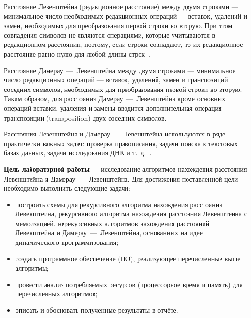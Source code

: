 
Расстояние Левенштейна (редакционное расстояние) между двумя строками --- минимальное число необходимых редакционных операций --- вставок, удалений и замен, необходимых для преобразования первой строки во вторую. При этом совпадения символов не являются операциями, которые учитываются в
редакционном расстоянии, поэтому, если строки совпадают, то их редакционное
расстояние равно нулю для любой длины строк~\cite{ulianov}. 

Расстояние Дамерау~---~Левенштейна между двумя строками --- минимальное число редакционных операций --- вставок, удалений, замен и транспозиций соседних символов, необходимых для преобразования первой строки во вторую. Таким образом, для расстояния Дамерау~---~Левенштейна кроме основных операций вставки, удаления и замены вводится дополнительная операция транспозиции (transposition) двух соседних символов.

Расстояния Левенштейна и Дамерау~---~Левенштейна используются в ряде практически важных задач: проверка правописания, задачи поиска в текстовых базах данных, задачи исследования ДНК и т.~д.~\cite{ulianov}.

\textbf{Цель лабораторной работы} --- исследование алгоритмов нахождения расстояния Левенштейна и Дамерау~---~Левенштейна. Для достижения поставленной цели необходимо выполнить следующие задачи:

\begin{itemize}
\item построить схемы для рекурсивного алгоритма нахождения расстояния Левенштейна, рекурсивного алгоритма нахождения расстояния Левенштейна с мемоизацией, нерекурсивных алгоритмов нахождения расстояний Левенштейна и Дамерау~---~Левенштейна, основанных на идее динамического программирования;
\item создать программное обеспечение (ПО), реализующее перечисленные выше алгоритмы;
\item провести анализ потребляемых ресурсов (процессорное время и память) для перечисленных алгоритмов;
\item описать и обосновать полученные результаты в отчёте.
\end{itemize}

